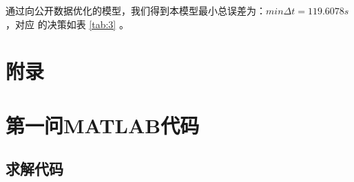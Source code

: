 \documentclass[hyperref,a4paper,UTF8]{ctexart}
\begin{document}
通过向公开数据优化的模型，我们得到本模型最小总误差为：$min\Delta t = 119.6078s$，对应
的决策如表 \ref{tab:3} 。
\newpage
\nocite{庞之浩2021}
\nocite{黄翔宇2021}
\nocite{冯伟2021}
\nocite{王敏2013}
\nocite{张青斌2017}
\nocite{陈正2020}
\nocite{唐明章2021}
\nocite{滕锐2016}
\nocite{邱晨辉2021}
\nocite{胡志丹2021}
\nocite{杨璐2020}
\nocite{宋叶志2019}
\nocite{Null2021}

\section*{附录}
\appendix
\section{第一问MATLAB代码}
\subsection{求解代码}
\end{document}
